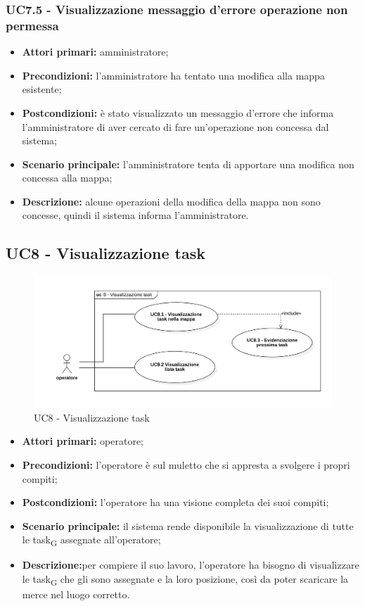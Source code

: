 \subsubsection{UC7.5 - Visualizzazione messaggio d'errore operazione non permessa}
\begin{itemize}
	\item 	\textbf{Attori primari:} amministratore;
	\item 	\textbf{Precondizioni:} l'amministratore ha tentato una modifica alla mappa esistente;
	\item 	\textbf{Postcondizioni:} è stato visualizzato un messaggio d'errore che informa l'amministratore di aver cercato di fare un'operazione non concessa dal sistema;
	\item 	\textbf{Scenario principale:} l'amministratore tenta di apportare una modifica non concessa alla mappa;
	\item 	\textbf{Descrizione:} alcune operazioni della modifica della mappa non sono concesse, quindi il sistema informa l'amministratore.
\end{itemize}

\subsection{UC8 - Visualizzazione task}

\begin{figure}[H]
	\centering
	\includegraphics[scale=0.52]{res/images/uc8.png}
	\caption{UC8 - Visualizzazione task}
\end{figure}


\begin{itemize}
	\item 	\textbf{Attori primari:} operatore;
	\item 	\textbf{Precondizioni:} l’operatore è sul muletto che si appresta a svolgere i propri compiti;
	\item 	\textbf{Postcondizioni:} l’operatore ha una visione completa dei suoi compiti;
	\item 	\textbf{Scenario principale:} il sistema rende disponibile la visualizzazione di tutte le \gls{task}\textsubscript{G} assegnate all’operatore;
	\item 	\textbf{Descrizione:}per compiere il suo lavoro, l’operatore ha bisogno di visualizzare le \gls{task}\textsubscript{G} che gli sono assegnate e la loro posizione, così da poter scaricare la merce nel luogo corretto.

\end{itemize}

